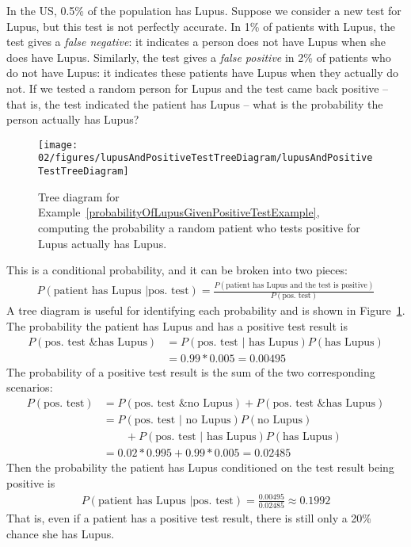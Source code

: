 \begin{example}{In the US, 0.5\% of the population has Lupus. Suppose we consider a new test for Lupus, but this test is not perfectly accurate. In 1\% of patients with Lupus, the test gives a \emph{false negative}: it indicates a person does not have Lupus when she does have Lupus. Similarly, the test gives a \emph{false positive} in 2\% of patients who do not have Lupus: it indicates these patients have Lupus when they actually do not. If we tested a random person for Lupus and the test came back positive -- that is, the test indicated the patient has Lupus -- what is the probability the person actually has Lupus?} \label{probabilityOfLupusGivenPositiveTestExample}
\begin{figure}
\centering
\texttt{[image: 02/figures/lupusAndPositiveTestTreeDiagram/lupusAndPositiveTestTreeDiagram]}
\caption{Tree diagram for Example~\ref{probabilityOfLupusGivenPositiveTestExample}, computing the probability a random patient who tests positive for Lupus actually has Lupus.}
\label{lupusAndPositiveTestTreeDiagram}
\end{figure}
This is a conditional probability, and it can be broken into two pieces:\vspace{-1.5mm}
\begin{align*}
P(\text{patient has Lupus } | \text{pos. test}) = \frac{P(\text{patient has Lupus and the test is positive})}{P(\text{pos. test})}
\end{align*}
A tree diagram is useful for identifying each probability and is shown in Figure~\ref{lupusAndPositiveTestTreeDiagram}. The probability the patient has Lupus and has a positive test result is\vspace{-1.5mm}
\begin{align*}
P(\text{pos. test \& has Lupus}) &= P(\text{pos. test } | \text{ has Lupus})P(\text{has Lupus}) \\
	&= 0.99*0.005 = 0.00495
\end{align*}
The probability of a positive test result is the sum of the two corresponding scenarios:\vspace{-1.5mm}
\begin{align*}
P(\text{pos. test}) &= P(\text{pos. test \& no Lupus}) + P(\text{pos. test \& has Lupus}) \\
	&= P(\text{pos. test } | \text{ no Lupus})P(\text{no Lupus}) \\
			   &\qquad + P(\text{pos. test } | \text{ has Lupus})P(\text{has Lupus}) \\
	&= 0.02*0.995 + 0.99*0.005 = 0.02485
\end{align*}
Then the probability the patient has Lupus conditioned on the test result being positive is
\begin{align*}
P(\text{patient has Lupus } | \text{pos. test}) = \frac{0.00495}{0.02485} \approx 0.1992
\end{align*}
That is, even if a patient has a positive test result, there is still only a 20\% chance she has Lupus.
\end{example}

